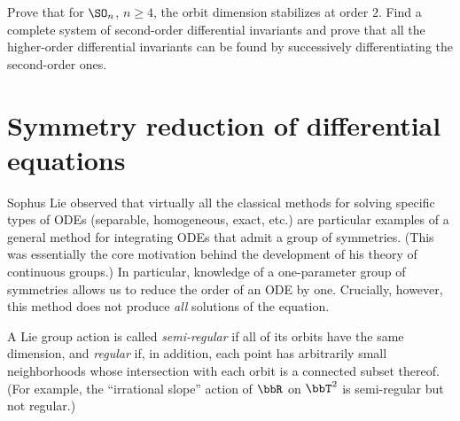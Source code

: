 \begin{xca}
    Prove that for $\SO_n$, $n\geq 4$, the orbit dimension stabilizes at order $2$. Find a complete system of second-order differential invariants and prove that all the higher-order differential invariants can be found by successively differentiating the second-order ones.
\end{xca}








\section{Symmetry reduction of differential equations}

Sophus Lie observed that virtually all the classical methods for solving specific types of ODEs (separable, homogeneous, exact, etc.) are particular examples of a general method for integrating ODEs that admit a group of symmetries. (This was essentially the core motivation behind the development of his theory of continuous groups.) In particular, knowledge of a one-parameter group of symmetries allows us to reduce the order of an ODE by one. Crucially, however, this method does not produce \emph{all} solutions of the equation.

\begin{rem}
    A Lie group action is called \emph{semi-regular} if all of its orbits have the same dimension, and \emph{regular} if, in addition, each point has arbitrarily small neighborhoods whose intersection with each orbit is a connected subset thereof. (For example, the ``irrational slope'' action of $\bbR$ on $\bbT^2$ is semi-regular but not regular.) 
\end{rem}

